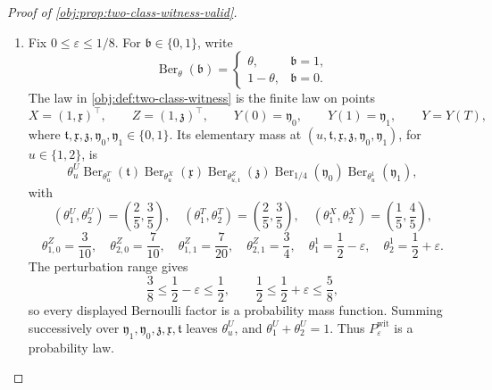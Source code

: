 \begin{proof}[Proof of \cref{obj:prop:two-class-witness-valid}]
\begin{enumerate}
\item Fix \(0\le \varepsilon\le 1/8\).  For \(\mathfrak b\in\{0,1\}\), write
\[
\operatorname{Ber}_{\theta}(\mathfrak b)
=
\begin{cases}
\theta,& \mathfrak b=1,\\
1-\theta,& \mathfrak b=0.
\end{cases}
\]
The law in \cref{obj:def:two-class-witness} is the finite law on points
\[
X=(1,\mathfrak x)^\top,\qquad
Z=(1,\mathfrak z)^\top,\qquad
Y(0)=\mathfrak y_0,\qquad
Y(1)=\mathfrak y_1,\qquad
Y=Y(T),
\]
where \(\mathfrak t,\mathfrak x,\mathfrak z,\mathfrak y_0,\mathfrak y_1\in\{0,1\}\).  Its elementary mass at
\((u,\mathfrak t,\mathfrak x,\mathfrak z,\mathfrak y_0,\mathfrak y_1)\), for \(u\in\{1,2\}\), is
\[
\theta^U_u
\operatorname{Ber}_{\theta^T_u}(\mathfrak t)
\operatorname{Ber}_{\theta^X_u}(\mathfrak x)
\operatorname{Ber}_{\theta^Z_{u,\mathfrak t}}(\mathfrak z)
\operatorname{Ber}_{1/4}(\mathfrak y_0)
\operatorname{Ber}_{\theta^1_u}(\mathfrak y_1),
\]
with
\[
(\theta^U_1,\theta^U_2)=\left(\frac25,\frac35\right),\quad
(\theta^T_1,\theta^T_2)=\left(\frac25,\frac35\right),\quad
(\theta^X_1,\theta^X_2)=\left(\frac15,\frac45\right),
\]
\[
\theta^Z_{1,0}=\frac3{10},\quad
\theta^Z_{2,0}=\frac7{10},\quad
\theta^Z_{1,1}=\frac7{20},\quad
\theta^Z_{2,1}=\frac34,\quad
\theta^1_1=\frac12-\varepsilon,\quad
\theta^1_2=\frac12+\varepsilon .
\]
The perturbation range gives
\[
\frac38\le \frac12-\varepsilon\le \frac12,
\qquad
\frac12\le \frac12+\varepsilon\le \frac58,
\]
so every displayed Bernoulli factor is a probability mass function.  Summing successively over
\(\mathfrak y_1,\mathfrak y_0,\mathfrak z,\mathfrak x,\mathfrak t\) leaves \(\theta^U_u\), and
\(\theta^U_1+\theta^U_2=1\).  Thus \(P_{\varepsilon}^{\mathrm{wit}}\) is a probability law. %


\end{enumerate}
\end{proof}
